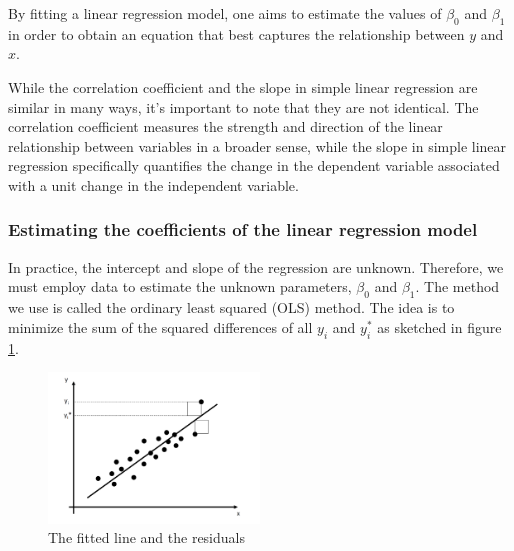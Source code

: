 \documentclass[
  12pt,
  oneside]{book}
\theoremstyle{definition}
\theoremstyle{definition}
\theoremstyle{definition}
\theoremstyle{definition}
\theoremstyle{remark}
\begin{document}
By fitting a linear regression model, one aims to estimate the values of \(\beta_0\) and \(\beta_1\) in order to obtain an equation that best captures the relationship between \(y\) and \(x\).

While the correlation coefficient and the slope in simple linear regression are similar in many ways, it's important to note that they are not identical. The correlation coefficient measures the strength and direction of the linear relationship between variables in a broader sense, while the slope in simple linear regression specifically quantifies the change in the dependent variable associated with a unit change in the independent variable.

\hypertarget{estimating-the-coefficients-of-the-linear-regression-model}{%
\subsubsection{Estimating the coefficients of the linear regression model}\label{estimating-the-coefficients-of-the-linear-regression-model}}

In practice, the intercept and slope of the regression are unknown. Therefore, we must employ data to estimate the unknown parameters, \(\beta_0\) and \(\beta_1\).
The method we use is called the ordinary least squared (OLS) method. The idea is to minimize the sum of the squared differences of all \(y_i\) and \(y_i^*\) as sketched in figure \ref{fig:regressionols}.

\begin{figure}
\centering
\includegraphics[width=0.5\textwidth,height=\textheight]{fig/regression_ols.png}
\caption{\label{fig:regressionols} The fitted line and the residuals}
\end{figure}
\end{document}
